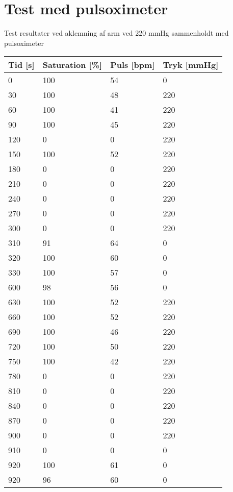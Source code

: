 \section{Test med pulsoximeter} \label{app:pulstest}

Test resultater ved aklemning af arm ved 220 mmHg sammenholdt med pulsoximeter
\begin{longtable}{p{} p{} p{} p{} }
	\hline
	Tid [s] & Saturation [\%] & Puls [bpm] & Tryk [mmHg] \\ \hline
	0 &	100 &	54 &	0 \\ \hline
	30 &	100 &	48 &	220 \\ \hline
	60 &	100 &	41 &	220 \\ \hline
	90 &	100	& 45  &	220 \\ \hline
	120	& 0	& 0	& 220 \\ \hline
	150 &	100 &	52 &	220 \\ \hline
	180	& 0 &	0 &	220 \\ \hline
	210	& 0	 & 0 &	220 \\ \hline
	240 &	0 &	0 &	220 \\ \hline
	270 &	0 &	0 &	220 \\ \hline
	300 &	0 &	0 &	220 \\ \hline
	310 &	91 &	64 &	0 \\ \hline
	320 &	100 &	60 &	0 \\ \hline
	330 &	100 &	57 &	0 \\ \hline
	600 &	98 &	56 &	0 \\ \hline
	630 &	100 &	52 &	220 \\ \hline
	660 &	100 &	52 &	220 \\ \hline
	690 &	100 &	46 &	220 \\ \hline
	720 &	100 &	50 &	220 \\ \hline
	750	 & 100 &	42 &	220 \\ \hline
	780 &	0 &	0 &	220 \\ \hline
	810 &	0 &	0 &	220 \\ \hline
	840 &	0 &	0 &	220 \\ \hline
	870 &	0 &	0 &	220 \\ \hline
	900 &	0 &	0 &	220 \\ \hline
	910 &	0 &	0 &	0 \\ \hline
	920 &	100 &	61 &	0 \\ \hline
	920 &	96 &	60 &	0 \\ \hline
\end{longtable}